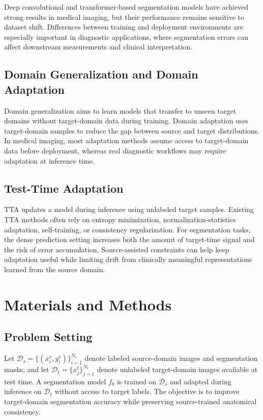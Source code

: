 \documentclass[diagnostics,article,submit,pdftex,moreauthors]{Definitions/mdpi}
\begin{document}
Deep convolutional and transformer-based segmentation models have achieved strong results in medical imaging, but their performance remains sensitive to dataset shift. Differences between training and deployment environments are especially important in diagnostic applications, where segmentation errors can affect downstream measurements and clinical interpretation.

\subsection{Domain Generalization and Domain Adaptation}

Domain generalization aims to learn models that transfer to unseen target domains without target-domain data during training. Domain adaptation uses target-domain samples to reduce the gap between source and target distributions. In medical imaging, most adaptation methods assume access to target-domain data before deployment, whereas real diagnostic workflows may require adaptation at inference time.

\subsection{Test-Time Adaptation}

TTA updates a model during inference using unlabeled target samples. Existing TTA methods often rely on entropy minimization, normalization-statistics adaptation, self-training, or consistency regularization. For segmentation tasks, the dense prediction setting increases both the amount of target-time signal and the risk of error accumulation. Source-assisted constraints can help keep adaptation useful while limiting drift from clinically meaningful representations learned from the source domain.

\section{Materials and Methods}

\subsection{Problem Setting}

Let $\mathcal{D}_{s}=\{(x_i^s,y_i^s)\}_{i=1}^{N_s}$ denote labeled source-domain images and segmentation masks, and let $\mathcal{D}_{t}=\{x_j^t\}_{j=1}^{N_t}$ denote unlabeled target-domain images available at test time. A segmentation model $f_{\theta}$ is trained on $\mathcal{D}_{s}$ and adapted during inference on $\mathcal{D}_{t}$ without access to target labels. The objective is to improve target-domain segmentation accuracy while preserving source-trained anatomical consistency.
\end{document}
